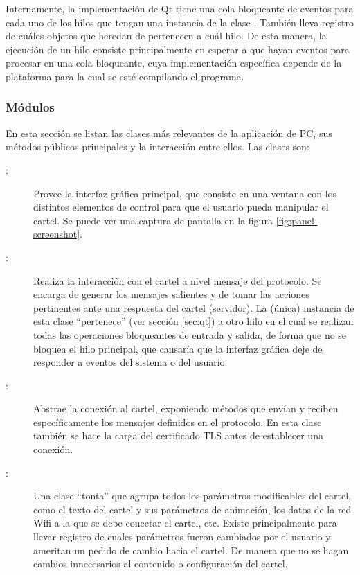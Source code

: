 Internamente, la implementación de Qt tiene una cola bloqueante de eventos para cada uno de los hilos que tengan una instancia de la clase . También lleva registro de cuáles objetos que heredan de  pertenecen a cuál hilo. De esta manera, la ejecución de un hilo consiste principalmente en esperar a que hayan eventos para procesar en una cola bloqueante, cuya implementación específica depende de la plataforma para la cual se esté compilando el programa.

\subsubsection{Módulos}
En esta sección se listan las clases más relevantes de la aplicación de PC, sus métodos públicos principales y la interacción entre ellos.
Las clases son:
\begin{description}
	\item[:] Provee la interfaz gráfica principal, que consiste en una ventana con los distintos elementos de control para que el usuario pueda manipular el cartel. Se puede ver una captura de pantalla en la figura \ref{fig:panel-screenshot}.
	\item[:] Realiza la interacción con el cartel a nivel mensaje del protocolo. Se encarga de generar los mensajes salientes y de tomar las acciones pertinentes ante una respuesta del cartel (servidor). La (única) instancia de esta clase \enquote{pertenece} (ver sección \ref{sec:qt}) a otro hilo en el cual se realizan todas las operaciones bloqueantes de entrada y salida, de forma que no se bloquea el hilo principal, que causaría que la interfaz gráfica deje de responder a eventos del sistema o del usuario.
	\item[:] Abstrae la conexión al cartel, exponiendo métodos que envían y reciben específicamente los mensajes definidos en el protocolo. En esta clase también se hace la carga del certificado TLS antes de establecer una conexión.
	\item[:] Una clase \enquote{tonta} que agrupa todos los parámetros modificables del cartel, como el texto del cartel y sus parámetros de animación, los datos de la red Wifi a la que se debe conectar el cartel, etc. Existe principalmente para llevar registro de cuales parámetros fueron cambiados por el usuario y ameritan un pedido de cambio hacia el cartel. De manera que no se hagan cambios innecesarios al contenido o configuración del cartel.
\end{description}

